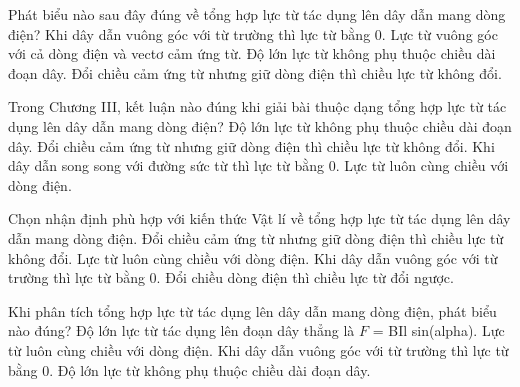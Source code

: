 \begin{ex}
Phát biểu nào sau đây đúng về tổng hợp lực từ tác dụng lên dây dẫn mang dòng điện?
\choice
{Khi dây dẫn vuông góc với từ trường thì lực từ bằng 0.}
{\True Lực từ vuông góc với cả dòng điện và vectơ cảm ứng từ.}
{Độ lớn lực từ không phụ thuộc chiều dài đoạn dây.}
{Đổi chiều cảm ứng từ nhưng giữ dòng điện thì chiều lực từ không đổi.}
\end{ex}

\begin{ex}
Trong Chương III, kết luận nào đúng khi giải bài thuộc dạng tổng hợp lực từ tác dụng lên dây dẫn mang dòng điện?
\choice
{Độ lớn lực từ không phụ thuộc chiều dài đoạn dây.}
{Đổi chiều cảm ứng từ nhưng giữ dòng điện thì chiều lực từ không đổi.}
{\True Khi dây dẫn song song với đường sức từ thì lực từ bằng 0.}
{Lực từ luôn cùng chiều với dòng điện.}
\end{ex}

\begin{ex}
Chọn nhận định phù hợp với kiến thức Vật lí về tổng hợp lực từ tác dụng lên dây dẫn mang dòng điện.
\choice
{Đổi chiều cảm ứng từ nhưng giữ dòng điện thì chiều lực từ không đổi.}
{Lực từ luôn cùng chiều với dòng điện.}
{Khi dây dẫn vuông góc với từ trường thì lực từ bằng 0.}
{\True Đổi chiều dòng điện thì chiều lực từ đổi ngược.}
\end{ex}

\begin{ex}
Khi phân tích tổng hợp lực từ tác dụng lên dây dẫn mang dòng điện, phát biểu nào đúng?
\choice
{\True Độ lớn lực từ tác dụng lên đoạn dây thẳng là $F$ = BIl sin(alpha).}
{Lực từ luôn cùng chiều với dòng điện.}
{Khi dây dẫn vuông góc với từ trường thì lực từ bằng 0.}
{Độ lớn lực từ không phụ thuộc chiều dài đoạn dây.}
\end{ex}

